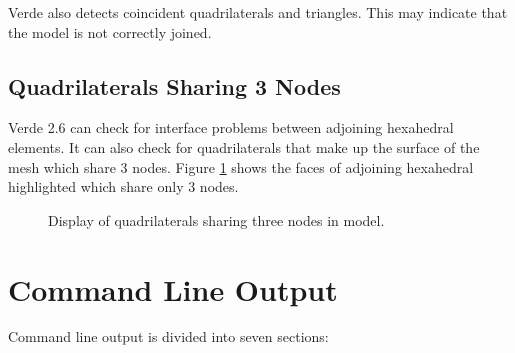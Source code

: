 \documentclass[10pt]{report}
\begin{document}

Verde also detects coincident quadrilaterals and triangles.  This may 
indicate that the model is not correctly joined.

\subsection{Quadrilaterals Sharing 3 Nodes}

Verde 2.6 can check for interface problems between adjoining 
hexahedral elements.  It can also check for quadrilaterals that make up the surface of the mesh which share 3 nodes.  Figure \ref{fig:quad_3_nodes} shows the faces of
adjoining hexahedral highlighted which share only 3 nodes.

\htmlrule
\begin{figure}[tbhp]
  \begin{center}
              {}
    \caption{Display of quadrilaterals sharing three nodes in model.}
    \label{fig:quad_3_nodes}
  \end{center}
\end{figure}     
\htmlrule


\section{Command Line Output}
\label{command_line}

Command line output is divided into seven sections:
\end{document}
